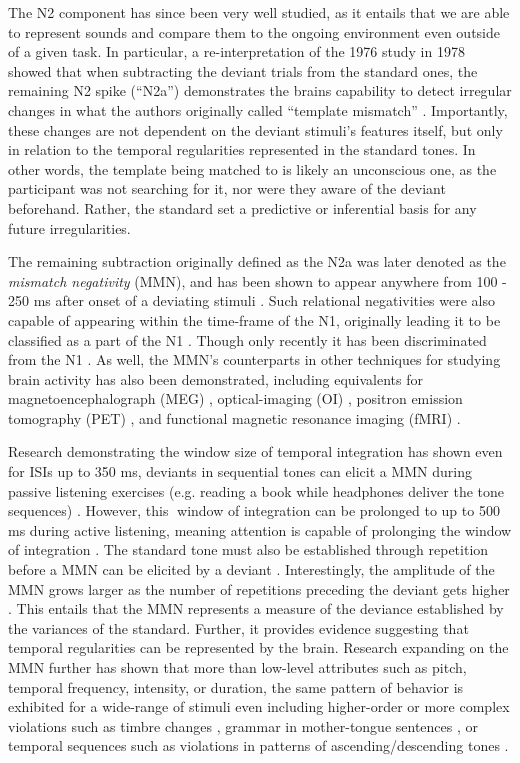 The N2 component has since been very well studied, as it entails that we are able to represent sounds and compare them to the ongoing environment even outside of a given task.  In particular, a re-interpretation of the 1976 study in 1978 showed that when subtracting the deviant trials from the standard ones, the remaining N2 spike (``N2a'') demonstrates the brains capability to detect irregular changes in what the authors originally called ``template mismatch'' \cite{Naatanen1978}.  Importantly, these changes are not dependent on the deviant stimuli's features itself, but only in relation to the temporal regularities represented in the standard tones.  In other words, the template being matched to is likely an unconscious one, as the participant was not searching for it, nor were they aware of the deviant beforehand.  Rather, the standard set a predictive or inferential basis for any future irregularities.  

The remaining subtraction originally defined as the N2a was later denoted as the \textit{mismatch negativity} (MMN), and has been shown to appear anywhere from 100 - 250 ms after onset of a deviating stimuli \cite{Naatanen1978,Naatanen1987,Naatanen2007,Campbell2007,Garrido2009,Naatanen2011}.  Such relational negativities were also capable of appearing within the time-frame of the N1, originally leading it to be classified as a part of the N1 \cite{Naatanen1987}.  Though only recently it has been discriminated from the N1 \cite{Campbell2007}.  As well, the MMN's counterparts in other techniques for studying brain activity has also been demonstrated, including equivalents for magnetoencephalograph (MEG) \cite{Hari1984}, optical-imaging (OI) \cite{Rinne1999}, positron emission tomography (PET) \cite{Tervaniemi2000}, and functional magnetic resonance imaging (fMRI) \cite{Celsis1999}.  

Research demonstrating the window size of temporal integration has shown even for ISIs up to 350 ms, deviants in sequential tones can elicit a MMN during passive listening exercises (e.g. reading a book while headphones deliver the tone sequences) \cite{Tervaniemi1994,Tervaniemi1997}.  However, this window of integration can be prolonged to up to 500 ms during active listening, meaning attention is capable of prolonging the window of integration \cite{Kanoh2001}.  The standard tone must also be established through repetition before a MMN can be elicited by a deviant \cite{Cowan1988}.  Interestingly, the amplitude of the MMN grows larger as the number of repetitions preceding the deviant gets higher \cite{Sams1983}.  This entails that the MMN represents a measure of the deviance established by the variances of the standard.   Further, it provides evidence suggesting that temporal regularities can be represented by the brain.  Research expanding on the MMN further has shown that more than low-level attributes such as pitch, temporal frequency, intensity, or duration, the same pattern of behavior is exhibited for a wide-range of stimuli even including higher-order or more complex violations such as timbre changes \cite{Tervaniemi1997a}, grammar in mother-tongue sentences \cite{Naatanen2001a}, or temporal sequences such as violations in patterns of ascending/descending tones \cite{Naatanen2007a,Garrido2009,Shamma2010}.

